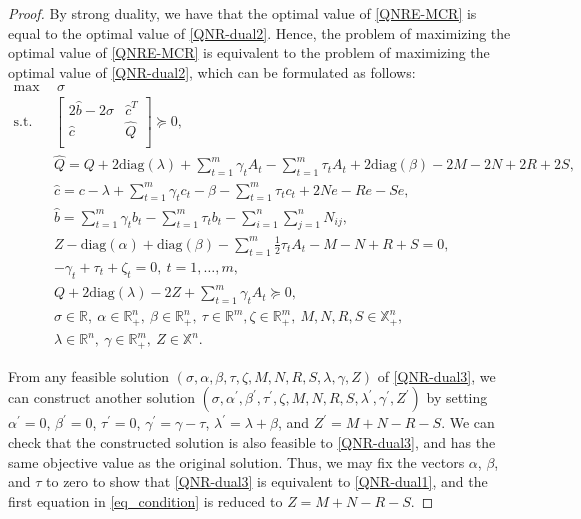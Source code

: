 \documentclass[10pt,a4paper]{amsart}
\begin{document}
\begin{proof}
	By strong duality, we have that the optimal value of \eqref{QNRE-MCR} is equal to the optimal value of \eqref{QNR-dual2}. Hence, the problem of maximizing the optimal value of \eqref{QNRE-MCR} is equivalent to the problem of maximizing the optimal value of \eqref{QNR-dual2}, which can be formulated as follows:
	\begin{equation}\label{QNR-dual3}
		\begin{aligned}
			\max ~&~ \sigma \\
			\mbox{s.t.} ~&\begin{bmatrix}
				2\hat{b}-2\sigma &\hat{c}^T\\
				\hat{c} ~&\hat{Q} \\
			\end{bmatrix}\succeq 0,\\
			&\hat{Q}=Q+2\textrm{diag}(\lambda)+\sum_{t=1}^m\gamma_t A_t-\sum_{t=1}^m \tau_t A_t +2\textrm{diag}(\beta)-2M-2N+2R+2S,\\
			&\hat{c}=c-\lambda+\sum_{t=1}^m \gamma_t c_t-\beta- \sum_{t=1}^m \tau_t c_t +2Ne-Re-Se,\\
			&\hat{b}=\sum_{t=1}^m \gamma_t b_t-\sum_{t=1}^m \tau_t b_t-\sum_{i=1}^n\sum_{j=1}^n N_{ij},\\
			&Z-\textrm{diag}(\alpha)+\textrm{diag}(\beta)-\sum_{t=1}^m\frac{1}{2} \tau_t A_t-M-N+R+S= 0,\\
			&-\gamma_t+\tau_t+\zeta_t=0,~t=1,\ldots,m,\\
			&Q+2\textrm{diag}(\lambda)-2Z+\sum_{t=1}^m \gamma_t A_t\succeq 0,\\
			&\sigma\in\mathbb{R},~\alpha\in \mathbb{R}^n_+,~\beta\in \mathbb{R}^n_+,~\tau\in \mathbb{R}^m,\zeta\in \mathbb{R}^m_+,~M,N,R,S\in\mathbb{X}_+^n,\\
			&\lambda\in\mathbb{R}^n,~\gamma\in\mathbb{R}^m_+,~Z\in\mathbb{X}^n.
		\end{aligned}
	\end{equation}
	
	From any feasible solution $(\sigma,\alpha,\beta,\tau,\zeta,M,N,R,S,\lambda,\gamma,Z)$ of \eqref{QNR-dual3}, we can construct another solution $(\sigma,\alpha^\prime,\beta^\prime,\tau^\prime,\zeta,M,N,R,S,\lambda^\prime,\gamma^\prime,Z^\prime)$ by setting $\alpha^\prime=0$, $\beta^\prime=0$, $\tau^\prime=0$, $\gamma^\prime=\gamma-\tau$, $\lambda^\prime=\lambda+\beta$, and $Z^\prime=M+N-R-S$. We can check that the constructed solution is also feasible to \eqref{QNR-dual3}, and has the same objective value as the original solution. Thus, we may fix the vectors $\alpha$, $\beta$, and $\tau$ to zero to show that \eqref{QNR-dual3} is equivalent to \eqref{QNR-dual1}, and the first equation in  \eqref{eq_condition} is reduced to $Z=M+N-R-S$.
\end{proof}
\end{document}
